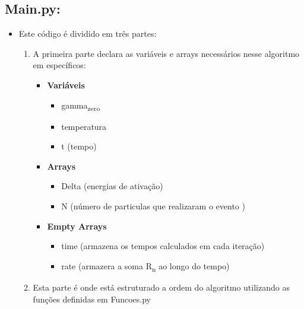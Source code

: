 \documentclass[11pt]{article}
\begin{document}
\subsection{Main.py:}
\label{sec:org90f0d1c}
\begin{itemize}
\item Este código é dividido em três partes:
\begin{enumerate}
\item A primeira parte declara as variáveis e arrays necessários nesse algoritmo em específicos:

\begin{itemize}
\item \textbf{Variáveis}
\begin{itemize}
\item gamma\textsubscript{zero}
\item temperatura
\item t (tempo)
\end{itemize}
\item \textbf{Arrays}
\begin{itemize}
\item Delta (energias de ativação)
\item N (número de particulas que realizaram o evento )
\end{itemize}
\item \textbf{Empty Arrays}
\begin{itemize}
\item time (armazena os tempos calculados em cada iteração)
\item rate (armazera a soma R\textsubscript{n} ao longo do tempo)
\end{itemize}
\end{itemize}

\item Esta parte é onde está estruturado a ordem do algoritmo utilizando as funções definidas em Funcoes.py


\end{enumerate}
\end{itemize}
\end{document}
